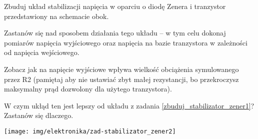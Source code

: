 \dbEntryCheckResults
\noindent\begin{minipage}[b]{0.7\textwidth}
Zbuduj układ stabilizacji napięcia w oparciu o diodę Zenera i tranzystor przedstawiony na schemacie obok.

Zastanów się nad sposobem działania tego układu – w tym celu dokonaj pomiarów napięcia wyjściowego oraz napięcia na bazie tranzystora w zależności od napięcia wejściowego.

Zobacz jak na napięcie wyjściowe wpływa wielkość obciążenia symulowanego przez R2 (pamiętaj aby nie ustawiać zbyt małej rezystancji, bo przekroczysz maksymalny prąd dozwolony dla użytego tranzystora).

W czym ukłąd ten jest lepszy od układu z zadania \ref{zbuduj_stabilizator_zener1}? Zastanów się dlaczego.
\end{minipage}
\hfill
\begin{minipage}[b]{0.25\textwidth}
\texttt{[image: img/elektronika/zad-stabilizator\_zener2]}
\end{minipage}
\fi


